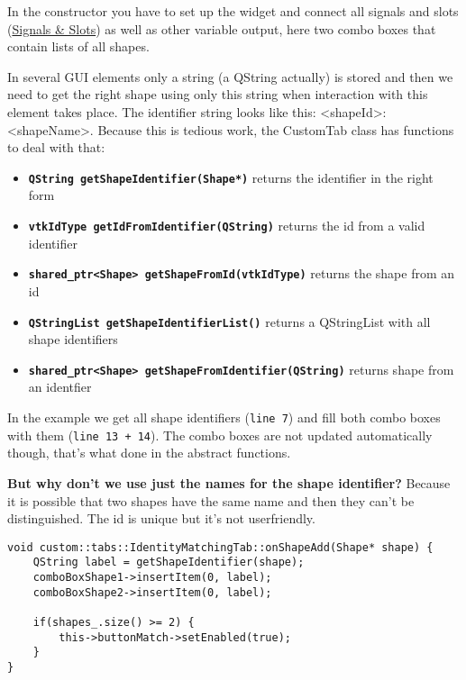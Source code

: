 In the constructor you have to set up the widget and connect all signals and slots (\href{http://qt-project.org/doc/qt-4.8/signalsandslots.html}{Signals \& Slots}) as well as other variable output, here two combo boxes that contain lists of all shapes. 

In several GUI elements only a string (a QString actually) is stored and then we need to get the right shape using only this string when interaction with this element takes place. The identifier string looks like this: <shapeId>:<shapeName>. Because this is tedious work, the CustomTab class has functions to deal with that: 

\begin{itemize}
	\item \textbf{\texttt{QString getShapeIdentifier(Shape*)}} returns the identifier in the right form
	\item \textbf{\texttt{vtkIdType getIdFromIdentifier(QString)}} returns the id from a valid identifier
	\item \textbf{\texttt{shared\_ptr<Shape> getShapeFromId(vtkIdType)}} returns the shape from an id
	\item \textbf{\texttt{QStringList getShapeIdentifierList()}} returns a QStringList with all shape identifiers
	\item \textbf{\texttt{shared\_ptr<Shape> getShapeFromIdentifier(QString)}} returns shape from an identfier
\end{itemize}

In the example we get all shape identifiers (\texttt{line 7}) and fill both combo boxes with them (\texttt{line 13 + 14}). The combo boxes are not updated automatically though, that's what done in the abstract functions. 

\begin{mdframed}
\textbf{But why don't we use just the names for the shape identifier?} Because it is possible that two shapes have the same name and then they can't be distinguished. The id is unique but it's not userfriendly.
\end{mdframed}

\begin{lstlisting}[style=lstStyleCpp, caption={IdentityMatchingTab.cpp, onShapeAdd}]
void custom::tabs::IdentityMatchingTab::onShapeAdd(Shape* shape) {
    QString label = getShapeIdentifier(shape);
    comboBoxShape1->insertItem(0, label);
    comboBoxShape2->insertItem(0, label);
    
    if(shapes_.size() >= 2) {
        this->buttonMatch->setEnabled(true);
    }
}
\end{lstlisting}

